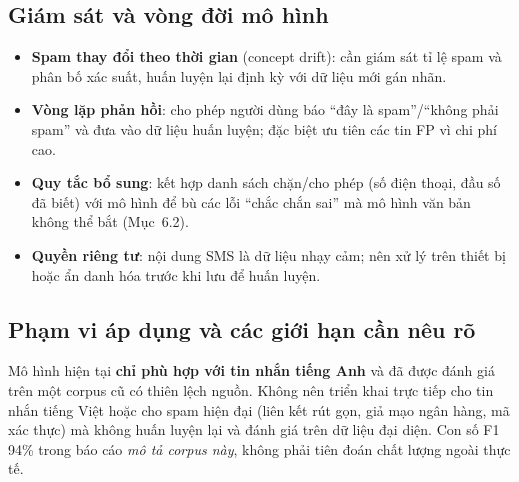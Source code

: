 \subsection{Giám sát và vòng đời mô hình}

\begin{itemize}
    \item \textbf{Spam thay đổi theo thời gian} (concept drift): cần giám sát tỉ lệ spam và phân bố xác suất, huấn luyện lại định kỳ với dữ liệu mới gán nhãn.
    \item \textbf{Vòng lặp phản hồi}: cho phép người dùng báo ``đây là spam''/``không phải spam'' và đưa vào dữ liệu huấn luyện; đặc biệt ưu tiên các tin FP vì chi phí cao.
    \item \textbf{Quy tắc bổ sung}: kết hợp danh sách chặn/cho phép (số điện thoại, đầu số đã biết) với mô hình để bù các lỗi ``chắc chắn sai'' mà mô hình văn bản không thể bắt (Mục~6.2).
    \item \textbf{Quyền riêng tư}: nội dung SMS là dữ liệu nhạy cảm; nên xử lý trên thiết bị hoặc ẩn danh hóa trước khi lưu để huấn luyện.
\end{itemize}

\subsection{Phạm vi áp dụng và các giới hạn cần nêu rõ}

Mô hình hiện tại \textbf{chỉ phù hợp với tin nhắn tiếng Anh} và đã được đánh giá trên một corpus cũ có thiên lệch nguồn. Không nên triển khai trực tiếp cho tin nhắn tiếng Việt hoặc cho spam hiện đại (liên kết rút gọn, giả mạo ngân hàng, mã xác thực) mà không huấn luyện lại và đánh giá trên dữ liệu đại diện. Con số F1 94\% trong báo cáo \textit{mô tả corpus này}, không phải tiên đoán chất lượng ngoài thực tế.
